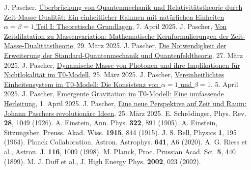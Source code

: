 \documentclass[12pt,a4paper]{article}
\begin{document}
	
	\begin{thebibliography}{99}
		 J. Pascher, \href{https://github.com/jpascher/T0-Time-Mass-Duality/tree/main/2/pdf/Deutsch/QMRelTimeMassPart1.pdf}{Überbrückung von Quantenmechanik und Relativitätstheorie durch Zeit-Masse-Dualität: Ein einheitlicher Rahmen mit natürlichen Einheiten \(\alpha = \beta = 1\) Teil I: Theoretische Grundlagen}, 7. April 2025.
		 J. Pascher, \href{https://github.com/jpascher/T0-Time-Mass-Duality/tree/main/2/pdf/Deutsch/MathZeitMasseLagrange.pdf}{Von Zeitdilatation zu Massenvariation: Mathematische Kernformulierungen der Zeit-Masse-Dualitätstheorie}, 29. März 2025.
		 J. Pascher, \href{https://github.com/jpascher/T0-Time-Mass-Duality/tree/main/2/pdf/Deutsch/NotwendigkeitQMErweiterung.pdf}{Die Notwendigkeit der Erweiterung der Standard-Quantenmechanik und Quantenfeldtheorie}, 27. März 2025.
		 J. Pascher, \href{https://github.com/jpascher/T0-Time-Mass-Duality/tree/main/2/pdf/Deutsch/DynMassePhotonenNichtlokal.pdf}{Dynamische Masse von Photonen und ihre Implikationen für Nichtlokalität im T0-Modell}, 25. März 2025.
		 J. Pascher, \href{https://github.com/jpascher/T0-Time-Mass-Duality/tree/main/2/pdf/Deutsch/Alpha1Beta1Konsistenz.pdf}{Vereinheitlichtes Einheitensystem im T0-Modell: Die Konsistenz von \(\alpha = 1\) und \(\beta = 1\)}, 5. April 2025.
		 J. Pascher, \href{https://github.com/jpascher/T0-Time-Mass-Duality/tree/main/2/pdf/Deutsch/EmergentGravT0.pdf}{Emergente Gravitation im T0-Modell: Eine umfassende Herleitung}, 1. April 2025.
		 J. Pascher, \href{https://github.com/jpascher/T0-Time-Mass-Duality/tree/main/2/pdf/Deutsch/ZeitRaumPascher.pdf}{Eine neue Perspektive auf Zeit und Raum: Johann Paschers revolutionäre Ideen}, 25. März 2025.
		 E. Schrödinger, Phys. Rev. \textbf{28}, 1049 (1926).
		 A. Einstein, Ann. Phys. \textbf{322}, 891 (1905).
		 A. Einstein, Sitzungsber. Preuss. Akad. Wiss. \textbf{1915}, 844 (1915).
		 J. S. Bell, Physics \textbf{1}, 195 (1964).
		 Planck Collaboration, Astron. Astrophys. \textbf{641}, A6 (2020).
		 A. G. Riess et al., Astron. J. \textbf{116}, 1009 (1998).
		 M. Planck, Proc. Prussian Acad. Sci. \textbf{5}, 440 (1899).
		 M. J. Duff et al., J. High Energy Phys. \textbf{2002}, 023 (2002).

\end{thebibliography}
\end{document}
